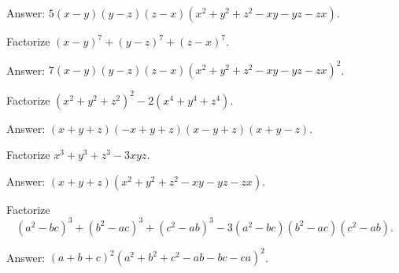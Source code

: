 \documentclass[12pt,a4paper]{memoir}
\theoremstyle{definition}
\begin{document}
\begin{solution}[name=Solution by Parviz Shahriari]
	Answer: $5(x-y)(y-z)(z-x)(x^2+y^2+z^2-xy-yz-zx)$.
\end{solution}


\begin{tcolorbox}
	\begin{question}
		Factorize $(x-y)^7 + (y-z)^7 + (z-x)^7$.
	\end{question}
\end{tcolorbox}

\begin{solution}[name=Solution by Parviz Shahriari]
	Answer: $7(x-y)(y-z)(z-x)(x^2+y^2+z^2-xy-yz-zx)^2$.
\end{solution}


\begin{tcolorbox}
	\begin{question}
		Factorize $(x^2+y^2+z^2)^2 - 2(x^4+y^4+z^4)$.
	\end{question}
\end{tcolorbox}

\begin{solution}[name=Solution by Parviz Shahriari]
	Answer: $(x+y+z)(-x+y+z)(x-y+z)(x+y-z)$.
\end{solution}



\begin{tcolorbox}
	\begin{question}
		Factorize $x^3+y^3+z^3-3xyz$.
	\end{question}
\end{tcolorbox}

\begin{solution}[name=Solution by Parviz Shahriari]
	Answer: $(x+y+z)(x^2+y^2+z^2-xy-yz-zx)$.
\end{solution}


\begin{tcolorbox}
	\begin{question}
		Factorize \[(a^2-bc)^3+(b^2-ac)^3+(c^2-ab)^3-3(a^2-bc)(b^2-ac)(c^2-ab).\]
	\end{question}
\end{tcolorbox}

\begin{solution}[name=Solution by Parviz Shahriari]
	Answer: $(a+b+c)^2(a^2+b^2+c^2-ab-bc-ca)^2$.
\end{solution}
\end{document}
